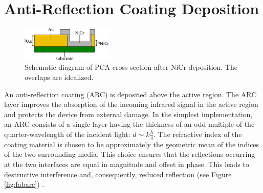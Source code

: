 \section{Anti-Reflection Coating Deposition}
\begin{figure} %
    \centering
    \includegraphics[width=0.39\textwidth]{figures/Fabrication/PCA_after_NiCr.pdf}
    \captionsetup{width=0.375\textwidth} %
    \caption{Schematic diagram of PCA cross section after NiCr deposition. The overlaps are idealized.}
    \label{fig:afterFab}
\end{figure}
An anti-reflection coating (ARC) is deposited above the active region. The ARC layer improves the absorption of the incoming infrared signal in the active region  \cite{chenAntireflectionImplementationsTerahertz2014} and protects the device from external damage. In the simplest implementation, an ARC consists of a single layer having the thickness of an odd multiple of the quarter-wavelength of the incident light: $d \sim k \frac{\lambda}{4}$. The refractive index of the coating material is chosen to be approximately the geometric mean of the indices of the two surrounding media. This choice ensures that the reflections occurring at the two interfaces are equal in magnitude and offset in phase. This leads to destructive interference and, consequently, reduced reflection (see Figure \ref{fig:fabarc}) \cite{paschottaAntireflectionCoatings2005}. 

